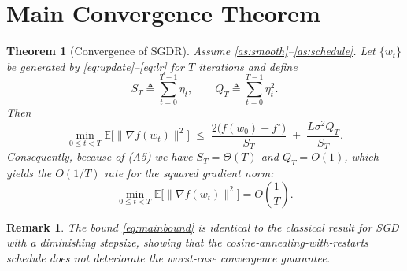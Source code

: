 \documentclass{article}
\newtheorem{theorem}{Theorem}
\newtheorem{remark}{Remark}
\begin{document}
\section*{Main Convergence Theorem}
\begin{theorem}[Convergence of SGDR]\label{thm:sgdr}
Assume \ref{as:smooth}–\ref{as:schedule}.  Let $\{w_t\}$ be generated by
\eqref{eq:update}–\eqref{eq:lr} for $T$ iterations and define
\[
S_T\triangleq\sum_{t=0}^{T-1}\eta_t,\qquad
Q_T\triangleq\sum_{t=0}^{T-1}\eta_t^{2}.
\]
Then
\begin{equation}
\min_{0\le t<T}\mathbb{E}\!\big[\|\nabla f(w_t)\|^{2}\big]
\;\le\;
\frac{2\big(f(w_0)-f^{\star}\big)}{S_T}
\;+\;
\frac{L\sigma^{2} Q_T}{S_T}.
\label{eq:mainbound}
\end{equation}
Consequently, because of (A5) we have $S_T=\Theta(T)$ and $Q_T=O(1)$,
which yields the $O(1/T)$ rate for the squared gradient norm:
\[
\min_{0\le t<T}\mathbb{E}\!\big[\|\nabla f(w_t)\|^{2}\big]
=O\!\left(\frac{1}{T}\right).
\]
\end{theorem}
\begin{remark}
The bound \eqref{eq:mainbound} is identical to the classical result for
SGD with a diminishing stepsize, showing that the cosine‑annealing-with‑restarts
schedule does not deteriorate the worst‑case convergence guarantee.
\end{remark}
\end{document}
